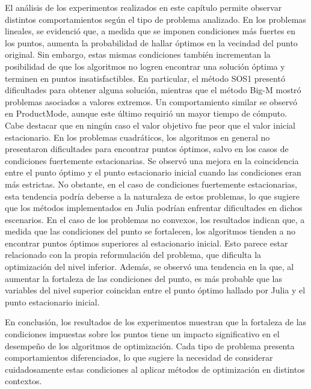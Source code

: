 El análisis de los experimentos realizados en este capítulo permite observar distintos comportamientos según el tipo de problema analizado.
En los problemas lineales, se evidenció que, a medida que se imponen condiciones más fuertes en los puntos, aumenta la probabilidad de hallar óptimos en la vecindad del punto original. 
Sin embargo, estas mismas condiciones también incrementan la posibilidad de que los algoritmos no logren encontrar una solución óptima y terminen en puntos insatisfactibles. 
En particular, el método SOS1 presentó dificultades para obtener alguna solución, mientras que el método Big-M mostró problemas asociados a valores extremos. 
Un comportamiento similar se observó en ProductMode, aunque este último requirió un mayor tiempo de cómputo. 
Cabe destacar que en ningún caso el valor objetivo fue peor que el valor inicial estacionario.  
En los problemas cuadráticos, los algoritmos en general no presentaron dificultades para encontrar puntos óptimos, salvo en los casos de condiciones fuertemente estacionarias. 
Se observó una mejora en la coincidencia entre el punto óptimo y el punto estacionario inicial cuando las condiciones eran más estrictas. 
No obstante, en el caso de condiciones fuertemente estacionarias, esta tendencia podría deberse a la naturaleza de estos problemas, 
lo que sugiere que los métodos implementados en Julia podrían enfrentar dificultades en dichos escenarios.  
En el caso de los problemas no convexos, los resultados indican que, a medida que las condiciones del punto se fortalecen, 
los algoritmos tienden a no encontrar puntos óptimos superiores al estacionario inicial. 
Esto parece estar relacionado con la propia reformulación del problema, 
que dificulta la optimización del nivel inferior. 
Además, se observó una tendencia en la que, al aumentar la fortaleza de las condiciones del punto, 
es más probable que las variables del nivel superior coincidan entre el punto óptimo hallado por Julia y 
el punto estacionario inicial.  

En conclusión, los resultados de los experimentos muestran que la fortaleza de las condiciones impuestas 
sobre los puntos tiene un impacto significativo en el desempeño de los algoritmos de optimización. 
Cada tipo de problema presenta comportamientos diferenciados, lo que sugiere la necesidad de considerar 
cuidadosamente estas condiciones al aplicar métodos de optimización en distintos contextos.
